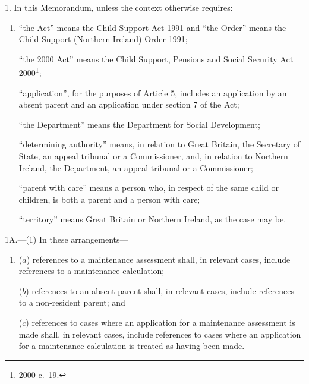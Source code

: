 \documentclass[12pt,a4paper]{article}
\begin{document}
1.  In this Memorandum, unless the context otherwise requires:
\begin{enumerate}\item[]
“the Act” means the Child Support Act 1991 and “the Order” means the Child Support (Northern Ireland) Order 1991;

“the 2000 Act” means the Child Support, Pensions and Social Security Act 2000\footnote{2000 c.\ 19.};

“application”, for the purposes of Article 5, includes an application by an absent parent and an application under section 7 of the Act;

“the Department” means the Department for Social Development;

“determining authority” means, in relation to Great Britain, the Secretary of State, an appeal tribunal or a Commissioner, and, in relation to Northern Ireland, the Department, an appeal tribunal or a Commissioner;

“parent with care” means a person who, in respect of the same child or children, is both a parent and a person with care;

“territory” means Great Britain or Northern Ireland, as the case may be.
\end{enumerate}


\medskip

1A.---(1)  In these arrangements—
\begin{enumerate}\item[]
($a$) references to a maintenance assessment shall, in relevant cases, include references to a maintenance calculation;

($b$) references to an absent parent shall, in relevant cases, include references to a non-resident parent; and

($c$) references to cases where an application for a maintenance assessment is made shall, in relevant cases, include references to cases where an application for a maintenance calculation is treated as having been made.
\end{enumerate}
\end{document}
